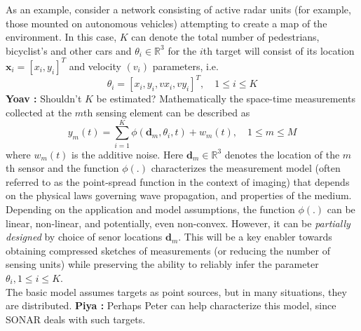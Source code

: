 \documentclass{article}
\newcommand{\comment}[3]{{\color{#1} {\bf #2 :} #3}}
\newcommand{\yoav}[1]{\comment{magenta}{Yoav}{#1}}
\newcommand{\piya}[1]{\comment{blue}{Piya}{#1}}
\newcommand{\rayan}[1]{\comment{red}{Rayan}{#1}}
\begin{document}
As an example, consider a network consisting of active radar units (for example, those mounted on autonomous vehicles) attempting to create a map of the environment. In this case, $K$ can denote the total number of pedestrians, bicyclist's and other cars and $\theta_i\in\mathbb{R}^3$ for the $i$th target will consist of its location $\mathbf{x}_i=[x_i,y_i]^T$ and velocity $(v_i)$ parameters, i.e.
\begin{equation} \theta_i = [ x_i, y_i, vx_i ,vy_i]^T, \quad 1\leq i\leq K  
\end{equation} 
\yoav{Shouldn't $K$ be estimated?}
Mathematically the space-time measurements collected at the $m$th sensing element can be described as \begin{equation} 
y_m (t) = \sum_{i=1}^{K} \phi (\mathbf{d}_m,\theta_i,t) + w_m(t), \quad 1\leq m\leq M
\end{equation}
where $w_m(t)$ is the additive noise. Here $\mathbf{d}_m\in \mathbb{R}^3$ denotes the location of the $m$th sensor and the function $\phi(.)$ characterizes the measurement model (often referred to as the point-spread function in the context of imaging) that depends on the physical laws governing wave propagation, and properties of the medium. Depending on the application and model assumptions, the function $\phi(.)$ can be linear, non-linear, and potentially, even non-convex. However, it can be {\em partially designed} by choice of senor locations $\mathbf{d}_m$. This will be a key enabler towards obtaining compressed sketches of measurements (or reducing the number of sensing units) while preserving the ability to reliably infer the parameter $\theta_i, 1\leq i\leq K$.\\

The basic model assumes targets as point sources, but in many situations, they are distributed. \piya{Perhaps Peter can help characterize this model, since SONAR deals with such targets}. 
\end{document}
